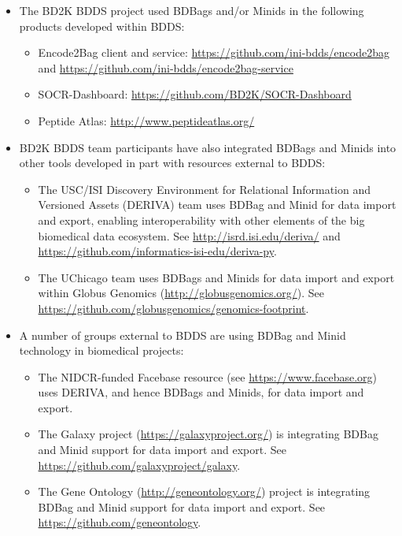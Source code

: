 \documentclass[11pt]{article}
\begin{document}
\begin{itemize}
\item
The BD2K BDDS project used BDBags and/or Minids in the following products developed within BDDS:
\begin{itemize}
\item
Encode2Bag client and service: \url{https://github.com/ini-bdds/encode2bag} and 
\url{https://github.com/ini-bdds/encode2bag-service}

\item
SOCR-Dashboard: \url{https://github.com/BD2K/SOCR-Dashboard}

\item
Peptide Atlas: \url{http://www.peptideatlas.org/}
\end{itemize}

\item
BD2K BDDS team participants have also integrated BDBags and Minids into other tools 
developed in part with resources external to BDDS:
\begin{itemize}
\item
The USC/ISI Discovery Environment for Relational Information and Versioned Assets (DERIVA) 
team uses BDBag and Minid for data import and export, enabling interoperability with other elements of the big biomedical data ecosystem. See \url{http://isrd.isi.edu/deriva/} and \url{https://github.com/informatics-isi-edu/deriva-py}.
\item
The UChicago team uses BDBags and Minids for data import and export within Globus Genomics 
(\url{http://globusgenomics.org/}). See \url{https://github.com/globusgenomics/genomics-footprint}.
\end{itemize}

\item
A number of groups external to BDDS are using BDBag and Minid technology in biomedical projects:
\begin{itemize}
\item
The NIDCR-funded Facebase resource (see \url{https://www.facebase.org}) uses DERIVA, and hence BDBags and Minids, for data import and export.

\item
The Galaxy project (\url{https://galaxyproject.org/}) is integrating BDBag and Minid support for data import and export. 
See \url{https://github.com/galaxyproject/galaxy}.

\item
The Gene Ontology (\url{http://geneontology.org/}) project is integrating BDBag and Minid support for data import and export.
See \url{https://github.com/geneontology}.


\end{itemize}
\end{itemize}
\end{document}
